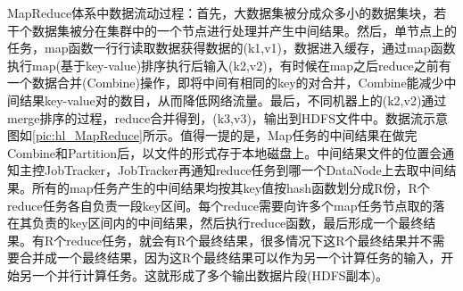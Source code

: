   MapReduce体系中数据流动过程：首先，大数据集被分成众多小的数据集块，若干个数据集被分在集群中的一个节点进行处理并产生中间结果。然后，单节点上的任务，map函数一行行读取数据获得数据的(k1,v1)，数据进入缓存，通过map函数执行map(基于key-value)排序执行后输入(k2,v2)，有时候在map之后reduce之前有一个数据合并(Combine)操作，即将中间有相同的key的对合并，Combine能减少中间结果key-value对的数目，从而降低网络流量。最后，不同机器上的(k2,v2)通过merge排序的过程，reduce合并得到，(k3,v3)，输出到HDFS文件中。数据流示意图如\autoref{pic:hl_MapReduce}所示。值得一提的是，Map任务的中间结果在做完Combine和Partition后，以文件的形式存于本地磁盘上。中间结果文件的位置会通知主控JobTracker，JobTracker再通知reduce任务到哪一个DataNode上去取中间结果。所有的map任务产生的中间结果均按其key值按hash函数划分成R份，R个reduce任务各自负责一段key区间。每个reduce需要向许多个map任务节点取的落在其负责的key区间内的中间结果，然后执行reduce函数，最后形成一个最终结果。有R个reduce任务，就会有R个最终结果，很多情况下这R个最终结果并不需要合并成一个最终结果，因为这R个最终结果可以作为另一个计算任务的输入，开始另一个并行计算任务。这就形成了多个输出数据片段(HDFS副本)。
  \begin{figure}
  \centering
    \label{pic:hl_MapReduce}
  \end{figure}

